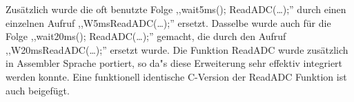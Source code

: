 Zus\"atzlich wurde die oft benutzte Folge ,,wait5ms(); ReadADC(\dots);'' durch einen einzelnen Aufruf
,,W5msReadADC(\dots);'' ersetzt.
Dasselbe wurde auch f\"ur die Folge ,,wait20ms(); ReadADC(\dots);'' gemacht, die durch den Aufruf
,,W20msReadADC(\dots);'' ersetzt wurde.
Die Funktion ReadADC wurde zus\"atzlich in Assembler Sprache portiert, so da"s diese Erweiterung
sehr effektiv integriert werden konnte.
Eine funktionell identische C-Version der ReadADC Funktion ist auch beigef\"ugt.
